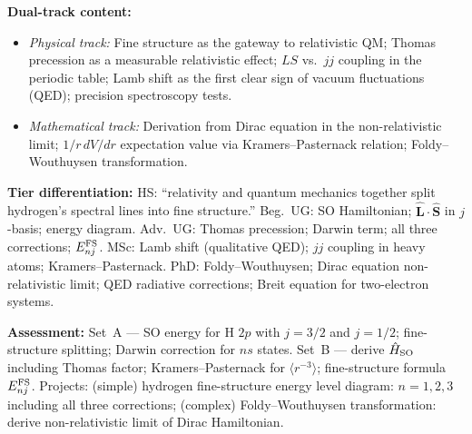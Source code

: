 \documentclass[11pt,a4paper]{article}
\begin{document}
\begin{tcolorbox}[modulebox, title={Module~I.4 / L08: Spin--Orbit Coupling and Fine Structure of Hydrogen}]
\medskip\textbf{Dual-track content:}
\begin{itemize}[leftmargin=1.4em,topsep=2pt,itemsep=1pt]
  \item \textit{Physical track:} Fine structure as the gateway to relativistic QM;
    Thomas precession as a measurable relativistic effect; $LS$ vs.\ $jj$ coupling in the periodic table;
    Lamb shift as the first clear sign of vacuum fluctuations (QED); precision spectroscopy tests.
  \item \textit{Mathematical track:} Derivation from Dirac equation in the non-relativistic limit;
    $1/r\,dV/dr$ expectation value via Kramers--Pasternack relation;
    Foldy--Wouthuysen transformation.
\end{itemize}

\medskip\textbf{Tier differentiation:}
HS: ``relativity and quantum mechanics together split hydrogen's spectral lines into fine structure.''
Beg.\ UG: SO Hamiltonian; $\hat{\mathbf{L}}\cdot\hat{\mathbf{S}}$ in $j$-basis; energy diagram.
Adv.\ UG: Thomas precession; Darwin term; all three corrections; $E_{nj}^{\rm FS}$.
MSc: Lamb shift (qualitative QED); $jj$ coupling in heavy atoms; Kramers--Pasternack.
PhD: Foldy--Wouthuysen; Dirac equation non-relativistic limit; QED radiative corrections;
Breit equation for two-electron systems.

\medskip\textbf{Assessment:}
Set~A --- SO energy for H $2p$ with $j=3/2$ and $j=1/2$; fine-structure splitting;
Darwin correction for $ns$ states.
Set~B --- derive $\hat{H}_{\rm SO}$ including Thomas factor; Kramers--Pasternack for $\langle r^{-3}\rangle$;
fine-structure formula $E_{nj}^{\rm FS}$.
Projects: (simple) hydrogen fine-structure energy level diagram: $n=1,2,3$ including all three corrections;
(complex) Foldy--Wouthuysen transformation: derive non-relativistic limit of Dirac Hamiltonian.
\end{tcolorbox}


\medskip
\end{document}
